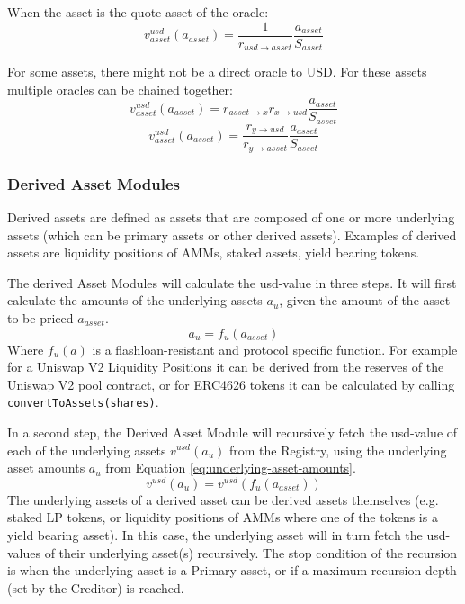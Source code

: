 \documentclass[sigconf,nonacm]{acmart}
\begin{document}
When the asset is the quote-asset of the oracle:
\begin{equation}
    v^{usd}_{asset}(a_{asset}) = \frac{1}{r_{usd\rightarrow asset}} \frac{a_{asset}}{S_{asset}}
\end{equation}

For some assets, there might not be a direct oracle to USD.
For these assets multiple oracles can be chained together:
\begin{equation}
    v^{usd}_{asset}(a_{asset}) = r_{asset\rightarrow x} r_{x\rightarrow usd} \frac{a_{asset}}{S_{asset}}
\end{equation}
\begin{equation}
    v^{usd}_{asset}(a_{asset}) = \frac{r_{y\rightarrow usd}}{r_{y\rightarrow asset}} \frac{a_{asset}}{S_{asset}}
\end{equation}

\subsubsection{Derived Asset Modules}
Derived assets are defined as assets that are composed of one or more underlying assets (which can be primary assets or other derived assets).
Examples of derived assets are liquidity positions of AMMs, staked assets, yield bearing tokens.

The derived Asset Modules will calculate the usd-value in three steps.
It will first calculate the amounts of the underlying assets $a_{u}$, given the amount of the asset to be priced $a_{asset}$.
\begin{equation}
    \label{eq:underlying-asset-amounts}
    a_{u} = f_{u}(a_{asset})
\end{equation}
Where $f_{u}(a)$ is a flashloan-resistant and protocol specific function.
For example for a Uniswap V2 Liquidity Positions it can be derived from the reserves of the Uniswap V2 pool contract,
or for ERC4626 tokens it can be calculated by calling \texttt{convertToAssets(shares)}.

In a second step, the Derived Asset Module will recursively fetch the usd-value of each of the underlying assets $v^{usd}(a_{u})$ from the Registry,
using the underlying asset amounts $a_{u}$ from Equation \ref{eq:underlying-asset-amounts}.
\begin{equation}
    v^{usd}(a_{u}) = v^{usd}(f_{u}(a_{asset}))
\end{equation}
The underlying assets of a derived asset can be derived assets themselves (e.g. staked LP tokens, or liquidity positions of AMMs where one of the tokens is a yield bearing asset).
In this case, the underlying asset will in turn fetch the usd-values of their underlying asset(s) recursively.
The stop condition of the recursion is when the underlying asset is a Primary asset, or if a maximum recursion depth (set by the Creditor) is reached.
\end{document}
